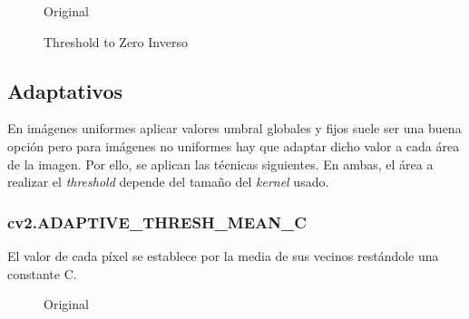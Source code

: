 \begin{figure}[H]
  \caption{Original}
  \centering \setlength\fboxsep{0pt} \setlength\fboxrule{0.5pt}
\end{figure}

\begin{figure}[H]
  \centering \setlength\fboxsep{0pt} \setlength\fboxrule{0.5pt}
  \caption{Threshold to Zero Inverso}
\end{figure}

\subsection{Adaptativos}
En imágenes uniformes aplicar valores umbral globales y fijos suele
ser una buena opción pero para imágenes no uniformes hay que adaptar
dicho valor a cada área de la imagen. Por ello, se aplican las
técnicas siguientes. En ambas, el área a realizar el \emph{threshold}
depende del tamaño del \emph{kernel} usado.

\subsubsection{cv2.ADAPTIVE\_THRESH\_MEAN\_C}
El valor de cada píxel se establece por la media de sus vecinos
restándole una constante C.

\begin{figure}[H]
  \caption{Original}
  \centering \setlength\fboxsep{0pt} \setlength\fboxrule{0.5pt}
\end{figure}

